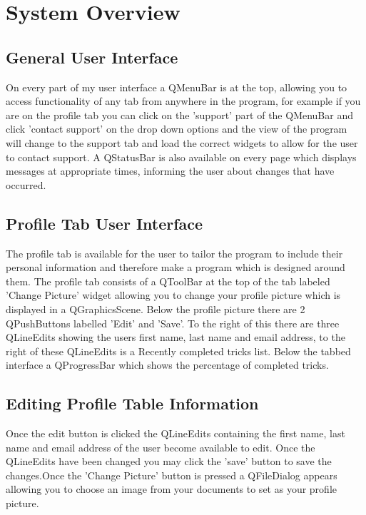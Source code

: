 \section{System Overview}

\subsection{General User Interface}

On every part of my user interface a QMenuBar is at the top, allowing you to access functionality of any tab from anywhere in the program, for example if you are on the profile tab you can click on the 'support' part of the QMenuBar and click 'contact support' on the drop down options and the view of the program will change to the support tab and load the correct widgets to allow for the user to contact support. A QStatusBar is also available on every page which displays messages at appropriate times, informing the user about changes that have occurred.

\subsection{Profile Tab User Interface}

The profile tab is available for the user to tailor the program to include their personal information and therefore make a program which is designed around them. The profile tab consists of a QToolBar at the top of the tab labeled 'Change Picture' widget allowing you to change your profile picture which is displayed in a QGraphicsScene. Below the profile picture there are 2 QPushButtons labelled 'Edit' and 'Save'. To the right of this there are three QLineEdits showing the users first name, last name and email address, to the right of these QLineEdits is a Recently completed tricks list. Below the tabbed interface a QProgressBar which shows the percentage of completed tricks.

\subsection{Editing Profile Table Information}
Once the edit button is clicked the QLineEdits containing the first name, last name and email address of the user become available to edit. Once the QLineEdits have been changed you may click the 'save' button to save the changes.Once the 'Change Picture' button is pressed a QFileDialog appears allowing you to choose an image from your documents to set as your profile picture.



